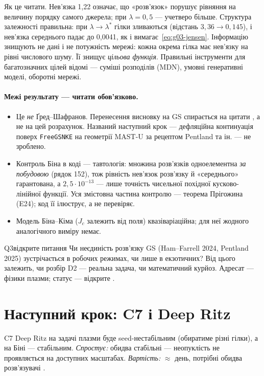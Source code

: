 Як це читати. Нев'язка 1,22 означає, що «розв'язок» порушує рівняння на величину порядку
самого джерела; при $\lambda=0{,}5$ --- учетверо більше. Структура залежності правильна:
при $\lambda\to\lambda^{*}$ гілки зливаються (відстань $3{,}36\to0{,}145$), і нев'язка
середнього падає до 0,0041, як і вимагає~\eqref{eq:g03-jensen}. Інформацію знищують не дані
і не потужність мережі: кожна окрема гілка має нев'язку на рівні числового шуму. Її знищує
\emph{цільова функція}. Правильні інструменти для багатозначних цілей відомі --- суміші
розподілів (MDN), умовні генеративні моделі, оборотні мережі.

\paragraph{Межі результату --- читати обов'язково.}
\begin{itemize}
\item Це \emph{не} Ґред--Шафранов. Перенесення висновку на GS спирається на цитати
  \cite{HamFarrell2024,Pentland2025,Bartolucci2021}, а не на цей розрахунок. Названий
  наступний крок --- дефляційна континуація поверх \texttt{FreeGSNKE} на геометрії MAST-U
  за рецептом Pentland та ін. --- не зроблено.
\item Контроль Біна в коді --- тавтологія: множина розв'язків одноелементна \emph{за
  побудовою} (рядок 152), тож рівність нев'язок розв'язку й «середнього» гарантована, а
  $2{,}5\cdot10^{-13}$ --- лише точність чисельної похідної кусково-лінійної функції. Уся
  змістовна частина контролю --- теорема Прігожина (E24); код її ілюструє, а не перевіряє.
\item Модель Біна--Кіма ($J_c$ залежить від поля) квазіваріаційна; для неї жодного
  аналогічного виміру немає.
\end{itemize}

\begin{itemcard}{Q3}{відкрите питання}
Чи неєдиність розв'язку GS (Ham--Farrell 2024, Pentland 2025) зустрічається в робочих
режимах, чи лише в екзотичних? Від цього залежить, чи розбір D2 --- реальна задача, чи
математичний курйоз. Адресат --- фізики плазми; статус --- відкрите \cite{RegQ}.
\end{itemcard}

\section{Наступний крок: C7 і Deep Ritz}\label{sec:g03-c7}

\begin{conjecture}{C7}
Deep Ritz на задачі плазми буде seed-нестабільним (обиратиме різні гілки), а на Біні ---
стабільним. \emph{Спростує:} обидва стабільні --- неопуклість не проявляється на доступних
масштабах. \emph{Вартість:} $\approx$ день, потрібні обидва розв'язувачі \cite{RegConj}.
\end{conjecture}

